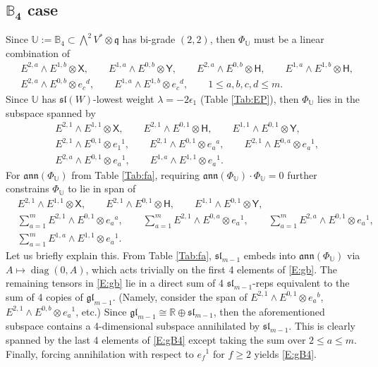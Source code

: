 \documentclass[pdftex]{sigma}%
\newcommand\tensor{\otimes}
\DeclareMathOperator{\diag}{diag}
\newcommand{\gl}{\mathfrak{gl}}
\newcommand\fann{\mathfrak{ann}}
\newcommand\fsl{\mathfrak{sl}}
\newcommand\fq {\mathfrak{q}}
\newcommand{\R}{\mathbb{R}}
\newcommand\bbU{\mathbb{U}}
\newcommand\bbB{\mathbb{B}}
\newcommand\sfX{\mathsf{X}}
\newcommand\sfH{\mathsf{H}}
\newcommand\sfY{\mathsf{Y}}
\numberwithin{equation}{section}
\begin{document}
\subsection[B\_4 case]{$\boldsymbol{\bbB_4}$ case} \label{S:PhiB4}
Since $\bbU := \bbB_4 \subset \bigwedge^2 V^* \otimes \fq$ has bi-grade $(2,2)$, then $\Phi_{\bbU}$ must be a linear combination of
\begin{align*}
& E^{2,a} \wedge E^{1,b} \tensor \sfX,\qquad E^{1,a} \wedge E^{0,b} \tensor \sfY,\qquad E^{2,a} \wedge E^{0,b} \tensor \sfH, \qquad E^{1,a} \wedge E^{1,b} \tensor \sfH,\\
& E^{2,a} \wedge E^{0,b} \tensor e_c{}^d, \qquad E^{1,a} \wedge E^{1,b} \tensor e_c{}^d, \qquad 1 \le a, b,c,d \le m.
\end{align*}
Since $\bbU$ has $\fsl(W)$-lowest weight $\lambda= -2\epsilon_1$ (Table \ref{Tab:EP}), then $\Phi_{\bbU}$ lies in the subspace spanned by
{\samepage\begin{align}
& E^{2,1} \wedge E^{1,1} \tensor \sfX, \qquad E^{2,1} \wedge E^{0,1} \tensor \sfH, \qquad E^{1,1} \wedge E^{0,1} \tensor \sfY,\nonumber\\
& E^{2,1} \wedge E^{0,1} \tensor e_1{}^1, \qquad E^{2,1} \wedge E^{0,1} \tensor e_a{}^a, \qquad E^{2,1} \wedge E^{0,a} \tensor e_a{}^1, \nonumber\\
& E^{2,a} \wedge E^{0,1} \tensor e_a{}^1, \qquad E^{1,a} \wedge E^{1,1} \tensor e_a{}^1.\label{E:gb}
\end{align}}
For $\fann(\Phi_{\bbU})$ from Table \ref{Tab:fa}, requiring $\fann(\Phi_{\bbU}) \cdot \Phi_{\bbU} = 0$ further constrains $\Phi_{\bbU}$ to lie in span of
\begin{align}\label{E:gB4}
&E^{2,1} \wedge E^{1,1} \tensor \sfX, \qquad E^{2,1} \wedge E^{0,1} \tensor \sfH, \qquad E^{1,1} \wedge E^{0,1} \tensor \sfY,\nonumber \\
& \sum_{a=1}^m E^{2,1} \wedge E^{0,1} \tensor e_a{}^a, \qquad \sum_{a=1}^m E^{2,1} \wedge E^{0,a} \tensor e_a{}^1, \qquad \sum_{a=1}^m E^{2,a} \wedge E^{0,1} \tensor e_a{}^1,\nonumber\\
& \sum_{a=1}^m E^{1,a} \wedge E^{1,1} \tensor e_a{}^1.
\end{align}
Let us briefly explain this. From Table \ref{Tab:fa}, $\fsl_{m-1}$ embeds into $\fann(\Phi_{\bbU})$ via $A \mapsto \diag(0,A)$, which acts trivially on the first 4 elements of \eqref{E:gb}. The remaining tensors in \eqref{E:gb} lie in a direct sum of 4 $\fsl_{m-1}$-reps equivalent to the sum of 4 copies of $\gl_{m-1}$. (Namely, consider the span of $E^{2,1} \wedge E^{0,1} \tensor e_a{}^b$, $E^{2,1} \wedge E^{0,b} \tensor e_a{}^1$, etc.) Since $\gl_{m-1} \cong \R \oplus \fsl_{m-1}$, then the aforementioned subspace contains a 4-dimensional subspace annihilated by $\fsl_{m-1}$. This is clearly spanned by the last 4 elements of \eqref{E:gB4} except taking the sum over $2 \leq a \leq m$. Finally, forcing annihilation with respect to $e_f{}^1$ for $f \geq 2$ yields \eqref{E:gB4}.
\end{document}
